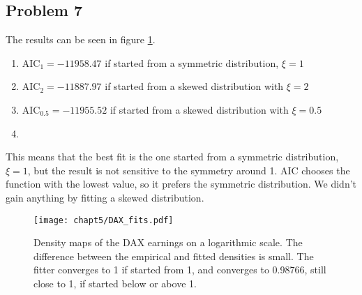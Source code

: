\documentclass{article}
\begin{document}
\subsection{Problem 7}
The results can be seen in figure \ref{fig:chapt5_DAX_fits}.
\begin{enumerate}
    \item $\text{AIC}_1 = -11958.47$ if started from a symmetric distribution, $\xi = 1$
    \item $\text{AIC}_2 = -11887.97$ if started from a skewed distribution with $\xi = 2$
    \item $\text{AIC}_{0.5} = -11955.52$ if started from a skewed distribution with $\xi = 0.5$
    \item
\end{enumerate}
This means that the best fit is the one started from a symmetric distribution, $\xi = 1$,
but the result is not sensitive to the symmetry around 1.
AIC chooses the function with the lowest value, so it prefers the symmetric distribution.
We didn't gain anything by fitting a skewed distribution.
\begin{figure}[ht]
    \centering
    \texttt{[image: chapt5/DAX\_fits.pdf]}
    \caption{Density maps of the DAX earnings on a logarithmic scale.
        The difference between the empirical and fitted densities is small.
        The fitter converges to 1 if started from 1, and converges to 0.98766,
        still close to 1, if started below or above 1.}
    \label{fig:chapt5_DAX_fits}
\end{figure}
\end{document}
